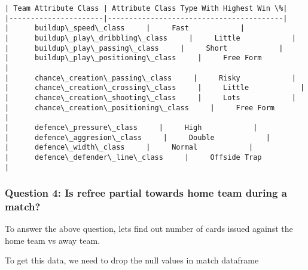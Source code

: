 \documentclass[11pt]{article}
\begin{document}
    \begin{Verbatim}[commandchars=\\\{\}]
| Team Attribute Class | Attribute Class Type With Highest Win \%|
|----------------------|-----------------------------------------|
|      buildup\_speed\_class     |     Fast            |
|      buildup\_play\_dribbling\_class     |     Little            |
|      buildup\_play\_passing\_class     |     Short            |
|      buildup\_play\_positioning\_class     |     Free Form            |
|      chance\_creation\_passing\_class     |     Risky            |
|      chance\_creation\_crossing\_class     |     Little            |
|      chance\_creation\_shooting\_class     |     Lots            |
|      chance\_creation\_positioning\_class     |     Free Form            |
|      defence\_pressure\_class     |     High            |
|      defence\_aggresion\_class     |     Double            |
|      defence\_width\_class     |     Normal            |
|      defence\_defender\_line\_class     |     Offside Trap            |

    \end{Verbatim}

    \hypertarget{question-4-is-refree-partial-towards-home-team-during-a-match}{%
\subsubsection{Question 4: Is refree partial towards home team during a
match?}\label{question-4-is-refree-partial-towards-home-team-during-a-match}}

    To answer the above question, lets find out number of cards issued
against the home team vs away team.

To get this data, we need to drop the null values in match dataframe
\end{document}
